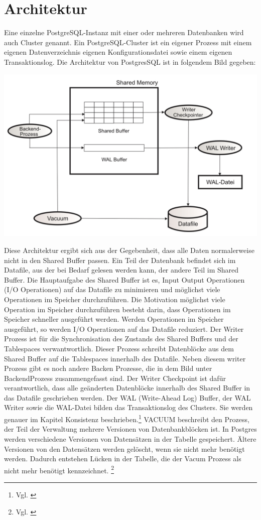 \section{Architektur}
Eine einzelne PostgreSQL-Instanz mit einer oder mehreren Datenbanken wird auch Cluster genannt. Ein PostgreSQL-Cluster ist ein eigener Prozess mit einem eigenen Datenverzeichnis eigenen Konfigurationsdatei sowie einem eigenen Transaktionslog.
Die Architektur von PostgresSQL ist in folgendem Bild gegeben:
\begin{center}
    \includegraphics[width = \linewidth]{./images/PostgresSQLArchitektur.jpg}
\end{center}
Diese Architektur ergibt sich aus der Gegebenheit, dass alle Daten normalerweise nicht in den Shared Buffer passen. Ein Teil der Datenbank befindet sich im Datafile, aus der bei Bedarf gelesen werden kann, der andere Teil im Shared Buffer.
Die Hauptaufgabe des Shared Buffer ist es, Input Output Operationen (I/O Operationen) auf das Datafile zu minimieren und möglichst viele Operationen im Speicher durchzuführen. Die Motivation möglichst viele Operation im Speicher durchzuführen
besteht darin, dass Operationen im Speicher schneller ausgeführt werden. Werden Operationen im Speicher ausgeführt, so werden I/O Operationen auf das Datafile reduziert. Der Writer Prozess ist für die Synchronisation
des Zustands des Shared Buffers und der Tablespaces verwantwortlich. Dieser Prozess schreibt Datenblöcke aus dem Shared Buffer auf die Tablespaces innerhalb des Datafile. Neben diesem writer Prozess gibt es noch andere Backen
Prozesse, die in dem Bild unter BackendProzess zusammengefasst sind. Der Writer Checkpoint ist dafür verantwortlich, dass alle geänderten Datenblöcke innerhalb des Shared Buffer in das Datafile geschrieben werden. Der WAL (Write-Ahead Log) Buffer, der WAL Writer
sowie die WAL-Datei bilden das Transaktionslog des Clusters. Sie werden genauer im Kapitel Konsistenz beschrieben.\footnote{Vgl. \cite[Seite 26]{froehlich01}} VACUUM beschreibt den Prozess, der Teil der Verwaltung mehrere Versionen
von Datenbankblöcken ist. In Postgres werden verschiedene Versionen von Datensätzen in der Tabelle gespeichert. Ältere Versionen von den Datensätzen werden gelöscht, wenn sie nicht mehr benötigt werden. Dadurch entstehen
Lücken in der Tabelle, die der Vacum Prozess als nicht mehr benötigt kennzeichnet. \footnote{Vgl. \cite[Seite 37]{froehlich01}}

